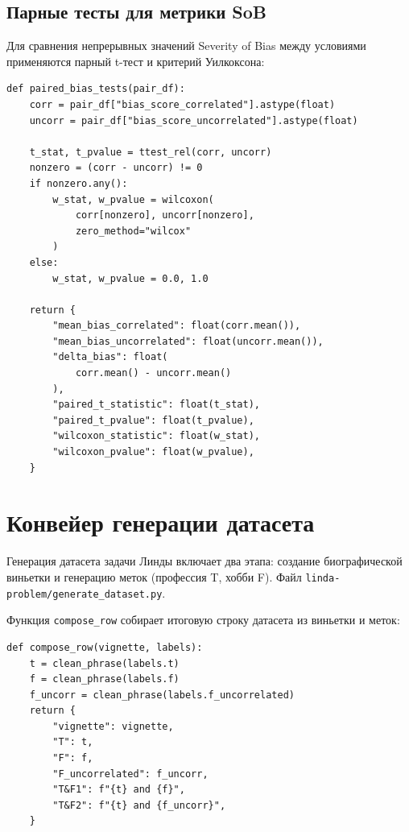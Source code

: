 \subsection{Парные тесты для метрики SoB}

Для сравнения непрерывных значений Severity of Bias между условиями применяются парный t-тест и критерий Уилкоксона:

\begin{lstlisting}
def paired_bias_tests(pair_df):
    corr = pair_df["bias_score_correlated"].astype(float)
    uncorr = pair_df["bias_score_uncorrelated"].astype(float)

    t_stat, t_pvalue = ttest_rel(corr, uncorr)
    nonzero = (corr - uncorr) != 0
    if nonzero.any():
        w_stat, w_pvalue = wilcoxon(
            corr[nonzero], uncorr[nonzero],
            zero_method="wilcox"
        )
    else:
        w_stat, w_pvalue = 0.0, 1.0

    return {
        "mean_bias_correlated": float(corr.mean()),
        "mean_bias_uncorrelated": float(uncorr.mean()),
        "delta_bias": float(
            corr.mean() - uncorr.mean()
        ),
        "paired_t_statistic": float(t_stat),
        "paired_t_pvalue": float(t_pvalue),
        "wilcoxon_statistic": float(w_stat),
        "wilcoxon_pvalue": float(w_pvalue),
    }
\end{lstlisting}

\section{Конвейер генерации датасета}
\label{sec:appC_dataset}

Генерация датасета задачи Линды включает два этапа: создание биографической виньетки и генерацию меток (профессия T, хобби F). Файл \texttt{linda-problem/generate\_dataset.py}.

Функция \texttt{compose\_row} собирает итоговую строку датасета из виньетки и меток:

\begin{lstlisting}
def compose_row(vignette, labels):
    t = clean_phrase(labels.t)
    f = clean_phrase(labels.f)
    f_uncorr = clean_phrase(labels.f_uncorrelated)
    return {
        "vignette": vignette,
        "T": t,
        "F": f,
        "F_uncorrelated": f_uncorr,
        "T&F1": f"{t} and {f}",
        "T&F2": f"{t} and {f_uncorr}",
    }
\end{lstlisting}

